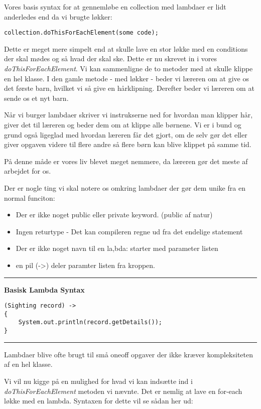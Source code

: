 \documentclass{article}
\begin{document}
Vores basis syntax for at gennemløbe en collection med lambdaer er lidt anderledes end da vi brugte løkker:
\begin{verbatim}
collection.doThisForEachElement(some code);
\end{verbatim}

Dette er meget mere simpelt end at skulle lave en stor løkke med en conditions der skal mødes og så hvad der skal ske. Dette er nu skrevet in i vores \textit{doThisForEachElement}. Vi kan sammenligne de to metoder med at skulle klippe en hel klasse. I den gamle metode - med løkker - beder vi læreren om at give os det første barn, hvilket vi så give en hårklipning. Derefter beder vi læreren om at sende os et nyt barn.

Når vi burger lambdaer skriver vi instrukserne ned for hvordan man klipper hår, giver det til læreren og beder dem om at klippe alle børnene. Vi er i bund og grund også ligeglad med hvordan læreren får det gjort, om de selv gør det eller giver opgaven videre til flere andre så flere børn kan blive klippet på samme tid.

På denne måde er vores liv blevet meget nemmere, da læreren gør det meste af arbejdet for os.

Der er nogle ting vi skal notere os omkring lambdaer der gør dem unike fra en normal funciton:
\begin{itemize}
    \item Der er ikke noget public eller private keyword. (public af natur)
    \item Ingen returtype - Det kan compileren regne ud fra det endelige statement
    \item Der er ikke noget navn til en la,bda: starter med parameter listen
    \item en pil (-\textgreater) deler paramter listen fra kroppen.
\end{itemize}

\vspace{0.3em}\hrule\vspace{0.3em}
\textbf{Basisk Lambda Syntax}
\begin{verbatim}
(Sighting record) -> 
{
    System.out.println(record.getDetails());
}
\end{verbatim}
\vspace{0.3em}\hrule

Lambdaer blive ofte brugt til små oneoff opgaver der ikke kræver kompleksiteten af en hel klasse.

Vi vil nu kigge på en mulighed for hvad vi kan indsætte ind i \textit{doThisForEachElement} metoden vi nævnte. Det er nemlig at lave en for-each løkke med en lambda. Syntaxen for dette vil se sådan her ud:
\end{document}
